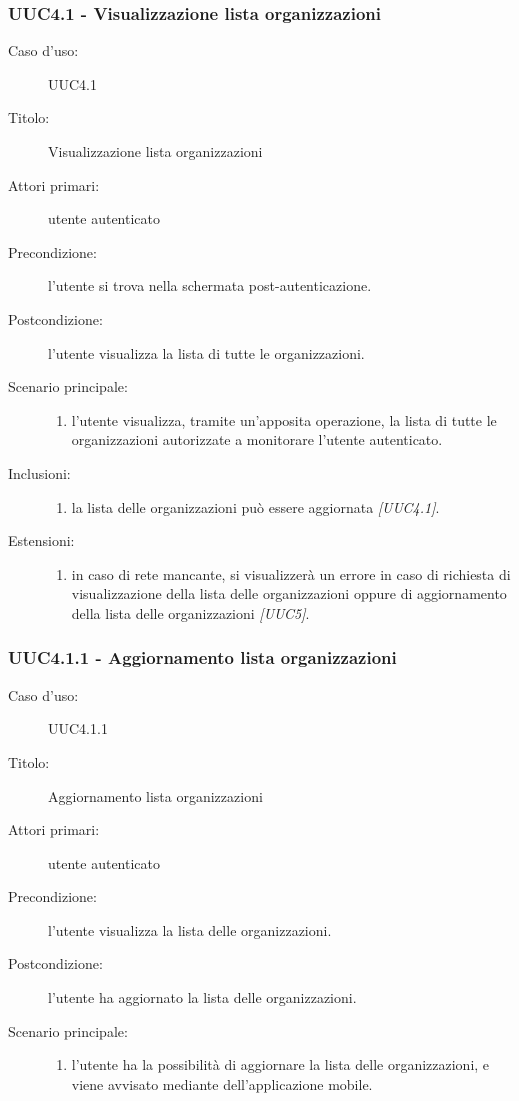\documentclass[../../../analisi-dei-requisiti.tex]{subfiles}
\begin{document}
\subsubsection{UUC4.1 - Visualizzazione lista organizzazioni}%
\label{subs:UUC4.1}
\begin{description}
  \item[Caso d’uso:] UUC4.1
  \item[Titolo:] Visualizzazione lista organizzazioni
  \item[Attori primari:] utente autenticato
  \item[Precondizione:] l'utente si trova nella schermata post-autenticazione.
  \item[Postcondizione:] l'utente visualizza la lista di tutte le organizzazioni.
  \item[Scenario principale:]
        \begin{enumerate}
          \item l'utente visualizza, tramite un'apposita operazione, la lista di tutte le organizzazioni autorizzate a monitorare l'utente autenticato.
        \end{enumerate}
  \item[Inclusioni:]
        \begin{enumerate}
          \item la lista delle organizzazioni può essere aggiornata \emph{[UUC4.1]}.
        \end{enumerate}
  \item[Estensioni:]
        \begin{enumerate}
          \item in caso di rete mancante, si visualizzerà un errore in caso di richiesta di visualizzazione della lista delle organizzazioni
                oppure di aggiornamento della lista delle organizzazioni \emph{[UUC5]}.
        \end{enumerate}
\end{description}

\subsubsection{UUC4.1.1 - Aggiornamento lista organizzazioni}%
\label{subs:UUC4.1.1}
\begin{description}
  \item[Caso d’uso:] UUC4.1.1
  \item[Titolo:] Aggiornamento lista organizzazioni
  \item[Attori primari:] utente autenticato
  \item[Precondizione:] l'utente visualizza la lista delle organizzazioni.
  \item[Postcondizione:] l'utente ha aggiornato la lista delle organizzazioni.
  \item[Scenario principale:]
        \begin{enumerate}
          \item l'utente ha la possibilità di aggiornare la lista delle organizzazioni, e viene avvisato mediante  dell'applicazione mobile.
        \end{enumerate}
\end{description}
\end{document}
